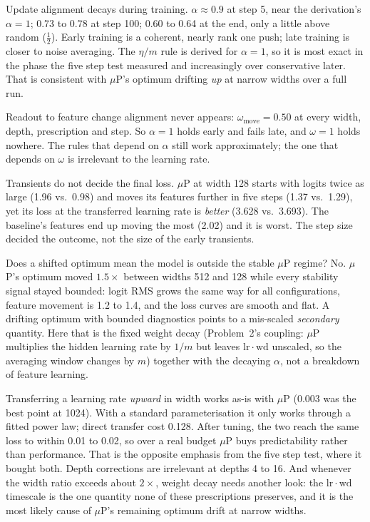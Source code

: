\documentclass[10pt,letterpaper]{article}
\newcommand{\muP}{$\mu$P}
\begin{document}
Update alignment decays during training. $\alpha\approx0.9$ at step 5, near the derivation's $\alpha=1$; 0.73 to 0.78 at step 100; 0.60 to 0.64 at the end, only a little above random ($\tfrac12$). Early training is a coherent, nearly rank one push; late training is closer to noise averaging. The $\eta/m$ rule is derived for $\alpha=1$, so it is most exact in the phase the five step test measured and increasingly over conservative later. That is consistent with \muP's optimum drifting \emph{up} at narrow widths over a full run.

Readout to feature change alignment never appears: $\omega_{\mathrm{move}}=0.50$ at every width, depth, prescription and step. So $\alpha=1$ holds early and fails late, and $\omega=1$ holds nowhere. The rules that depend on $\alpha$ still work approximately; the one that depends on $\omega$ is irrelevant to the learning rate.

Transients do not decide the final loss. \muP{} at width 128 starts with logits twice as large (1.96 vs.\ 0.98) and moves its features further in five steps (1.37 vs.\ 1.29), yet its loss at the transferred learning rate is \emph{better} (3.628 vs.\ 3.693). The baseline's features end up moving the most (2.02) and it is worst. The step size decided the outcome, not the size of the early transients.

Does a shifted optimum mean the model is outside the stable \muP{} regime? No. \muP's optimum moved $1.5\times$ between widths 512 and 128 while every stability signal stayed bounded: logit RMS grows the same way for all configurations, feature movement is 1.2 to 1.4, and the loss curves are smooth and flat. A drifting optimum with bounded diagnostics points to a mis-scaled \emph{secondary} quantity. Here that is the fixed weight decay (Problem~2's coupling: \muP{} multiplies the hidden learning rate by $1/m$ but leaves $\mathrm{lr}\cdot\mathrm{wd}$ unscaled, so the averaging window changes by $m$) together with the decaying $\alpha$, not a breakdown of feature learning.

Transferring a learning rate \emph{upward} in width works as-is with \muP{} (0.003 was the best point at 1024). With a standard parameterisation it only works through a fitted power law; direct transfer cost 0.128. After tuning, the two reach the same loss to within 0.01 to 0.02, so over a real budget \muP{} buys predictability rather than performance. That is the opposite emphasis from the five step test, where it bought both. Depth corrections are irrelevant at depths 4 to 16. And whenever the width ratio exceeds about $2\times$, weight decay needs another look: the $\mathrm{lr}\cdot\mathrm{wd}$ timescale is the one quantity none of these prescriptions preserves, and it is the most likely cause of \muP's remaining optimum drift at narrow widths.
\end{document}
